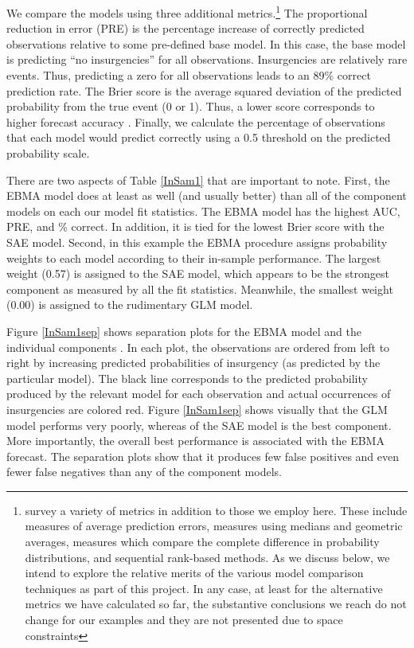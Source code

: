 \documentclass[pdftex,12pt,fullpage,oneside]{amsart}
\begin{document}
We compare the models using three additional
metrics.\footnote{\citet{brandt:freeman:schrodt:2011} survey a variety
  of metrics in addition to those we employ here. These include
  measures of average prediction errors, measures using medians and
  geometric averages, measures which compare the complete difference
  in probability distributions, and sequential rank-based methods.  As
  we discuss below, we intend to explore the relative merits of the
  various model comparison techniques as part of this project.  In any
  case, at least for the alternative metrics we have calculated so
  far, the substantive conclusions we reach do not change for our
  examples and they are not presented due to space constraints} The
proportional reduction in error (PRE) is the percentage increase of
correctly predicted observations relative to some pre-defined base
model. In this case, the base model is predicting ``no insurgencies''
for all observations.  Insurgencies are relatively rare events.  Thus,
predicting a zero for all observations leads to an 89\% correct
prediction rate. The Brier score is the average squared deviation of
the predicted probability from the true event (0 or 1).  Thus, a lower
score corresponds to higher forecast accuracy \citep{Brier:1950}.
Finally, we calculate the percentage of observations that each model
would predict correctly using a 0.5 threshold on the predicted
probability scale. 




There are two aspects of Table \ref{InSam1} that are important to
note.  First, the EBMA model does at least as well (and usually
better) than all of the component models on each our model fit
statistics.  The EBMA model has the highest AUC, PRE, and \% correct.
In addition, it is tied for the lowest Brier score with the SAE model.
Second, in this example the EBMA procedure assigns probability weights
to each model according to their in-sample performance.  The largest
weight (0.57) is assigned to the SAE model, which appears to be
the strongest component as measured by all the
fit statistics. Meanwhile, the smallest weight (0.00) is assigned to
the rudimentary GLM model.






Figure \ref{InSam1sep} shows separation plots for the EBMA model and
the individual components \citep{Greenhill:2011}. In each plot, the
observations are ordered from left to right by increasing predicted
probabilities of insurgency (as predicted by the particular
model). The black line corresponds to the predicted probability
produced by the relevant model for each observation and actual
occurrences of insurgencies are colored red.  Figure \ref{InSam1sep}
shows visually that the GLM model performs very poorly, whereas of the
SAE model is the best component.  More importantly, the overall best
performance is associated with the EBMA forecast. The separation plots
show that it produces few false positives and even fewer
false negatives than any of the component models.
\end{document}
